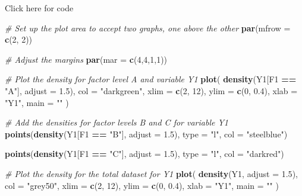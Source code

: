 \documentclass[
]{book}
\newenvironment{Shaded}{\begin{snugshade}}{\end{snugshade}}
\newcommand{\CommentTok}[1]{\textcolor[rgb]{0.56,0.35,0.01}{\textit{#1}}}
\newcommand{\DataTypeTok}[1]{\textcolor[rgb]{0.13,0.29,0.53}{#1}}
\newcommand{\DecValTok}[1]{\textcolor[rgb]{0.00,0.00,0.81}{#1}}
\newcommand{\FloatTok}[1]{\textcolor[rgb]{0.00,0.00,0.81}{#1}}
\newcommand{\KeywordTok}[1]{\textcolor[rgb]{0.13,0.29,0.53}{\textbf{#1}}}
\newcommand{\NormalTok}[1]{#1}
\newcommand{\OperatorTok}[1]{\textcolor[rgb]{0.81,0.36,0.00}{\textbf{#1}}}
\newcommand{\StringTok}[1]{\textcolor[rgb]{0.31,0.60,0.02}{#1}}
\begin{document}
Click here for code

\begin{Shaded}
\begin{Highlighting}[]

\CommentTok{# Set up the plot area to accept two graphs, one above the other}
\KeywordTok{par}\NormalTok{(}\DataTypeTok{mfrow =} \KeywordTok{c}\NormalTok{(}\DecValTok{2}\NormalTok{, }\DecValTok{2}\NormalTok{))}

\CommentTok{# Adjust the margins}
\KeywordTok{par}\NormalTok{(}\DataTypeTok{mar =} \KeywordTok{c}\NormalTok{(}\DecValTok{4}\NormalTok{,}\DecValTok{4}\NormalTok{,}\DecValTok{1}\NormalTok{,}\DecValTok{1}\NormalTok{))}

\CommentTok{# Plot the density for factor level A and variable Y1}
\KeywordTok{plot}\NormalTok{(}
  \KeywordTok{density}\NormalTok{(Y1[F1 }\OperatorTok{==}\StringTok{ "A"}\NormalTok{], }\DataTypeTok{adjust =} \FloatTok{1.5}\NormalTok{),}
  \DataTypeTok{col =} \StringTok{"darkgreen"}\NormalTok{,}
  \DataTypeTok{xlim =} \KeywordTok{c}\NormalTok{(}\DecValTok{2}\NormalTok{, }\DecValTok{12}\NormalTok{),}
  \DataTypeTok{ylim =} \KeywordTok{c}\NormalTok{(}\DecValTok{0}\NormalTok{, }\FloatTok{0.4}\NormalTok{),}
  \DataTypeTok{xlab =} \StringTok{"Y1"}\NormalTok{,}
  \DataTypeTok{main =} \StringTok{""}
\NormalTok{)}

\CommentTok{# Add the densities for factor levels B and C for variable Y1}
\KeywordTok{points}\NormalTok{(}\KeywordTok{density}\NormalTok{(Y1[F1 }\OperatorTok{==}\StringTok{ "B"}\NormalTok{], }\DataTypeTok{adjust =} \FloatTok{1.5}\NormalTok{), }
       \DataTypeTok{type =} \StringTok{"l"}\NormalTok{, }\DataTypeTok{col =} \StringTok{"steelblue"}\NormalTok{)}

\KeywordTok{points}\NormalTok{(}\KeywordTok{density}\NormalTok{(Y1[F1 }\OperatorTok{==}\StringTok{ "C"}\NormalTok{], }\DataTypeTok{adjust =} \FloatTok{1.5}\NormalTok{), }
       \DataTypeTok{type =} \StringTok{"l"}\NormalTok{, }\DataTypeTok{col =} \StringTok{"darkred"}\NormalTok{)}

\CommentTok{# Plot the density for the total dataset for Y1}
\KeywordTok{plot}\NormalTok{(}
  \KeywordTok{density}\NormalTok{(Y1, }\DataTypeTok{adjust =} \FloatTok{1.5}\NormalTok{),}
  \DataTypeTok{col =} \StringTok{"grey50"}\NormalTok{,}
  \DataTypeTok{xlim =} \KeywordTok{c}\NormalTok{(}\DecValTok{2}\NormalTok{, }\DecValTok{12}\NormalTok{),}
  \DataTypeTok{ylim =} \KeywordTok{c}\NormalTok{(}\DecValTok{0}\NormalTok{, }\FloatTok{0.4}\NormalTok{),}
  \DataTypeTok{xlab =} \StringTok{"Y1"}\NormalTok{,}
  \DataTypeTok{main =} \StringTok{""}
\NormalTok{)}


\end{Highlighting}
\end{Shaded}
\end{document}
